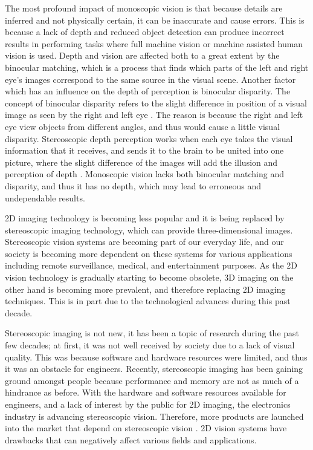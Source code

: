 \documentclass[12pt, journal]{IEEEtran}
\begin{document}
The most profound impact of monoscopic vision is that because details are inferred and not physically certain, it can be inaccurate and cause errors. This is because a lack of depth and reduced object detection can produce incorrect results in performing tasks where full machine vision or machine assisted human vision is used.  Depth and vision are affected both to a great extent by the binocular matching, which is a process that finds which parts of the left and right eye’s images correspond to the same source in the visual scene. Another factor which has an influence on the depth of perception is binocular disparity.  The concept of binocular disparity refers to the slight difference in position of a visual image as seen by the right and left eye \cite{naquet}. The reason is because the right and left eye view objects from different angles, and thus would cause a little visual disparity. Stereoscopic depth perception works when each eye takes the visual information that it receives, and sends it to the brain to be united into one picture, where the slight difference of the images will add the illusion and perception of depth \cite{naquet}. Monoscopic vision lacks both binocular matching and disparity, and thus it has no depth, which may lead to erroneous and undependable results.

2D imaging technology is becoming less popular and it is being replaced by stereoscopic imaging technology, which can provide three-dimensional images. Stereoscopic vision systems are becoming part of our everyday life, and our society is becoming more dependent on these systems for various applications including remote surveillance, medical, and entertainment purposes. As the 2D vision technology is gradually starting to become obsolete, 3D imaging on the other hand is becoming more prevalent, and therefore replacing 2D imaging techniques. This is in part due to the technological advances during this past decade.

Stereoscopic imaging is not new, it has been a topic of research during the past few decades; at first, it was not well received by society due to a lack of visual quality\cite{bryant}. This was because software and hardware resources were limited, and thus it was an obstacle for engineers. Recently, stereoscopic imaging has been gaining ground amongst people because performance and memory are not as much of a hindrance as before. With the hardware and software resources available for engineers, and a lack of interest by the public for 2D imaging, the electronics industry is advancing stereoscopic vision. Therefore, more products are launched into the market that depend on stereoscopic vision \cite{bryant}. 2D vision systems have drawbacks that can negatively affect various fields and applications.
\end{document}

